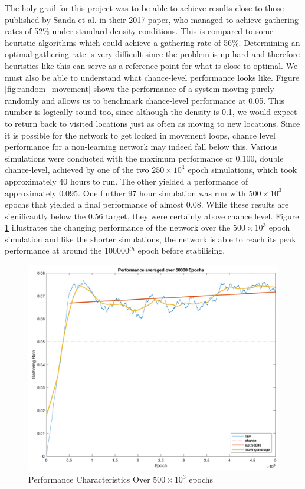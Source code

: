 \documentclass[11pt, twocolumn]{article}
\begin{document}
The holy grail for this project was to be able to achieve results close to those published by Sanda et al. \cite{sanda2017multi} in their 2017 paper, who managed to achieve gathering rates of 52\% under standard density conditions. This is compared to some heuristic algorithms which could achieve a gathering rate of 56\%. Determining an optimal gathering rate is very difficult since the problem is np-hard and therefore heuristics like this can serve as a reference point for what is close to optimal. We must also be able to understand what chance-level performance looks like. Figure \ref{fig:random_movement} shows the performance of a system moving purely randomly and allows us to benchmark chance-level performance at 0.05. This number is logically sound too, since although the density is 0.1, we would expect to return back to visited locations just as often as moving to new locations. Since it is possible for the network to get locked in movement loops, chance level performance for a non-learning network may indeed fall below this. Various simulations were conducted with the maximum performance or 0.100, double chance-level, achieved by one of the two $250\times10^3$ epoch simulations, which took approximately 40 hours to run. The other yielded a performance of approximately 0.095. One further 97 hour simulation was run with $500\times10^3$ epochs that yielded a final performance of almost 0.08. While these results are significantly below the 0.56 target, they were certainly above chance level. Figure \ref{fig:performance_500k} illustrates the changing performance of the network over the $500\times10^3$ epoch simulation and like the shorter simulations, the network is able to reach its peak performance at around the 100000$^{th}$ epoch before stabilising. 

\begin{figure}[H]
	\centering
	\includegraphics[width=\linewidth]{performance_500k}
	\caption{Performance Characteristics Over $500\times10^3$ epochs}
	\label{fig:performance_500k}
\end{figure}
\end{document}
